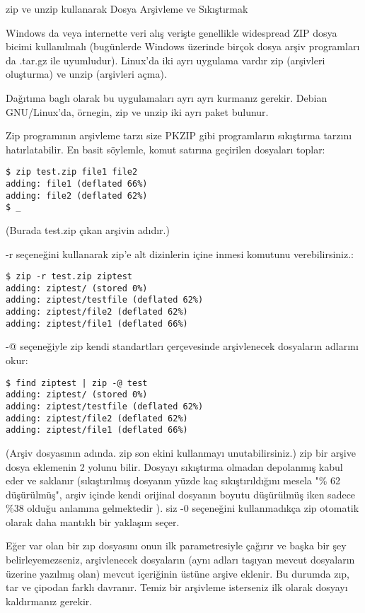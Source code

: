 \begin{section}{zip ve unzip kullanarak Dosya Arşivleme ve Sıkıştırmak}

Windows da veya internette veri alış verişte genellikle widespread ZIP dosya bicimi kullanılmalı (bugünlerde Windows üzerinde birçok dosya arşiv programları da .tar.gz ile uyumludur). Linux'da iki ayrı uygulama vardır zip (arşivleri oluşturma) ve unzip (arşivleri açma).

Dağıtıma baglı olarak bu uygulamaları ayrı ayrı kurmanız gerekir.
Debian GNU/Linux'da, örnegin, zip ve unzip iki ayrı paket bulunur.

Zip programının arşivleme tarzı size PKZIP gibi programların sıkıştırma tarzını
hatırlatabilir. En basit söylemle, komut satırına geçirilen dosyaları toplar:
\begin{verbatim}
$ zip test.zip file1 file2
adding: file1 (deflated 66%)
adding: file2 (deflated 62%)
$ _
\end{verbatim}

(Burada test.zip çıkan arşivin adıdır.)

-r seçeneğini kullanarak zip'e alt dizinlerin içine inmesi komutunu verebilirsiniz.:
\begin{verbatim}
$ zip -r test.zip ziptest
adding: ziptest/ (stored 0%)
adding: ziptest/testfile (deflated 62%)
adding: ziptest/file2 (deflated 62%)
adding: ziptest/file1 (deflated 66%)
\end{verbatim}

-@ seçeneğiyle zip kendi standartları çerçevesinde arşivlenecek dosyaların adlarını okur:
\begin{verbatim}
$ find ziptest | zip -@ test
adding: ziptest/ (stored 0%)
adding: ziptest/testfile (deflated 62%)
adding: ziptest/file2 (deflated 62%)
adding: ziptest/file1 (deflated 66%)
\end{verbatim}

(Arşiv dosyasının adında. zip son ekini kullanmayı unutabilirsiniz.)
zip bir arşive dosya eklemenin 2 yolunu bilir. Dosyayı sıkıştırma olmadan depolanmış kabul eder ve saklanır (sıkıştırılmış dosyanın yüzde kaç sıkıştırıldığını mesela "\% 62 düşürülmüş", arşiv içinde kendi orijinal dosyanın boyutu düşürülmüş iken sadece \%38 olduğu anlamına gelmektedir ). siz -0 seçeneğini kullanmadıkça zip otomatik olarak daha mantıklı bir yaklaşım seçer.

Eğer var olan bir zıp dosyasını onun ilk parametresiyle çağırır ve başka bir şey belirleyemezseniz, arşivlenecek dosyaların (aynı adları taşıyan mevcut dosyaların üzerine yazılmış olan) mevcut içeriğinin üstüne arşive eklenir. Bu durumda zıp, tar ve çipodan farklı davranır. Temiz bir arşivleme isterseniz ilk olarak dosyayı kaldırmanız gerekir.


\end{section}
